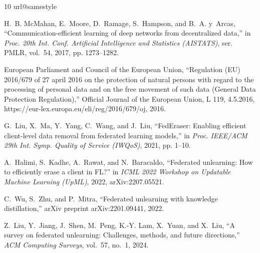 \documentclass[journal]{IEEEtran}
\begin{document}
\begin{thebibliography}{10}
\providecommand{\url}[1]{#1}
\csname url@samestyle\endcsname
\providecommand{\newblock}{\relax}
\providecommand{\bibinfo}[2]{#2}
\providecommand{\BIBentrySTDinterwordspacing}{\spaceskip=0pt\relax}
\providecommand{\BIBentryALTinterwordstretchfactor}{4}
\providecommand{\BIBentryALTinterwordspacing}{\spaceskip=\fontdimen2\font plus
\BIBentryALTinterwordstretchfactor\fontdimen3\font minus
  \fontdimen4\font\relax}
\providecommand{\BIBforeignlanguage}[2]{{%
\expandafter\ifx\csname l@#1\endcsname\relax
\typeout{** WARNING: IEEEtran.bst: No hyphenation pattern has been}%
\typeout{** loaded for the language `#1'. Using the pattern for}%
\typeout{** the default language instead.}%
\else
\language=\csname l@#1\endcsname
\fi
#2}}
\providecommand{\BIBdecl}{\relax}
\BIBdecl

H.~B. McMahan, E.~Moore, D.~Ramage, S.~Hampson, and B.~A. y~Arcas,
  ``Communication-efficient learning of deep networks from decentralized
  data,'' in \emph{Proc. 20th Int. Conf. Artificial Intelligence and Statistics
  (AISTATS)}, ser. PMLR, vol.~54, 2017, pp. 1273--1282.

{European Parliament and Council of the European Union}, ``Regulation ({EU})
  2016/679 of 27 april 2016 on the protection of natural persons with regard to
  the processing of personal data and on the free movement of such data
  ({General Data Protection Regulation}),'' Official Journal of the European
  Union, L 119, 4.5.2016, \url{https://eur-lex.europa.eu/eli/reg/2016/679/oj},
  2016.

G.~Liu, X.~Ma, Y.~Yang, C.~Wang, and J.~Liu, ``{FedEraser}: Enabling efficient
  client-level data removal from federated learning models,'' in \emph{Proc.
  IEEE/ACM 29th Int. Symp. Quality of Service (IWQoS)}, 2021, pp. 1--10.

A.~Halimi, S.~Kadhe, A.~Rawat, and N.~Baracaldo, ``Federated unlearning: How to
  efficiently erase a client in {FL}?'' in \emph{ICML 2022 Workshop on
  Updatable Machine Learning (UpML)}, 2022, arXiv:2207.05521.

C.~Wu, S.~Zhu, and P.~Mitra, ``Federated unlearning with knowledge
  distillation,'' arXiv preprint arXiv:2201.09441, 2022.

Z.~Liu, Y.~Jiang, J.~Shen, M.~Peng, K.-Y. Lam, X.~Yuan, and X.~Liu, ``A survey
  on federated unlearning: Challenges, methods, and future directions,''
  \emph{ACM Computing Surveys}, vol.~57, no.~1, 2024.


\end{thebibliography}
\end{document}
